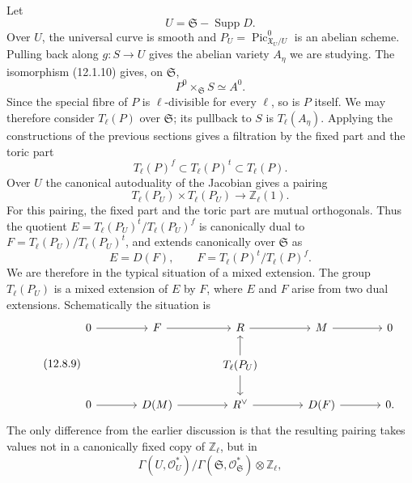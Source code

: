 \documentclass[11pt]{article}
\providecommand{\Pic}{\operatorname{Pic}}
\providecommand{\cO}{\mathcal O}
\providecommand{\Z}{\mathbb Z}
\begin{document}
Let
\begin{equation}\tag{12.8.4}
        U=\mathfrak S-\operatorname{Supp}D.
\end{equation}
Over \(U\), the universal curve is smooth and \(P_U=\Pic^0_{\mathfrak X_U/U}\) is an abelian scheme.  Pulling back along \(g:S\to U\) gives the abelian variety \(A_\eta\) we are studying.  The isomorphism (12.1.10) gives, on \(\mathfrak S\),
\begin{equation}\tag{12.8.5}
        P^0\times_{\mathfrak S} S\simeq A^0.
\end{equation}
Since the special fibre of \(P\) is \(\ell\)-divisible for every \(\ell\), so is \(P\) itself.  We may therefore consider \(T_\ell(P)\) over \(\mathfrak S\); its pullback to \(S\) is \(T_\ell(A_\eta)\).  Applying the constructions of the previous sections gives a filtration by the fixed part and the toric part
\begin{equation}\tag{12.8.6}
        T_\ell(P)^f\subset T_\ell(P)^t\subset T_\ell(P).
\end{equation}
Over \(U\) the canonical autoduality of the Jacobian gives a pairing
\begin{equation}\tag{12.8.7}
        T_\ell(P_U)\times T_\ell(P_U)\to\Z_\ell(1).
\end{equation}
For this pairing, the fixed part and the toric part are mutual orthogonals.  Thus the quotient \(E=T_\ell(P_U)^t/T_\ell(P_U)^f\) is canonically dual to \(F=T_\ell(P_U)/T_\ell(P_U)^t\), and extends canonically over \(\mathfrak S\) as
\begin{equation}\tag{12.8.8}
        E=D(F),\qquad F=T_\ell(P)^t/T_\ell(P)^f.
\end{equation}
We are therefore in the typical situation of a mixed extension.  The group \(T_\ell(P_U)\) is a mixed extension of \(E\) by \(F\), where \(E\) and \(F\) arise from two dual extensions.  Schematically the situation is
\begin{equation}\tag{12.8.9}
\begin{tikzcd}[column sep=large]
0\arrow[r]&F\arrow[r]&R\arrow[r]&M\arrow[r]&0\\
&&T_\ell(P_U)\arrow[u]\arrow[d]&&\\
0\arrow[r]&D(M)\arrow[r]&R^\vee\arrow[r]&D(F)\arrow[r]&0.
\end{tikzcd}
\end{equation}
The only difference from the earlier discussion is that the resulting pairing takes values not in a canonically fixed copy of \(\Z_\ell\), but in
\[
        \Gamma(U,\cO_U^*)/\Gamma(\mathfrak S,\cO_{\mathfrak S}^*)\otimes\Z_\ell,
\]
\end{document}
